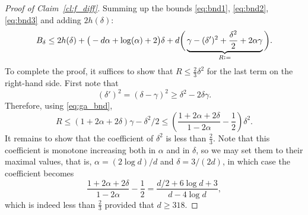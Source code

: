 \documentclass[10pt,a4paper]{amsart}
\newcommand\Coefd{\frac{2}{3}}
\newcommand\al{\alpha}
\newcommand\de{\delta}
\newcommand{\defeq}{\mathrel{\vcenter{\baselineskip0.5ex \lineskiplimit0pt
                     \hbox{\scriptsize.}\hbox{\scriptsize.}}}%
                     =}
\newcommand\ga{\gamma}
\begin{document}
\begin{proof}[Proof of Claim~\ref{cl:f_diff}]
Summing up the bounds \eqref{eq:bnd1}, \eqref{eq:bnd2}, \eqref{eq:bnd3} and adding $2 h(\de)$:
%
\[ B_\de 
\leq 2 h(\de) 
+ \big( -d\al + \log(\al) + 2 \big) \de 
+ d\bigg( 
\underbrace{\ga -(\de')^2 + \frac{\de^2}{2} + 2\al\ga}_
{R \defeq} \bigg) .\]
%
To complete the proof, it suffices to show that $R \leq \Coefd \de^2$ for the last term on the right-hand side. First note that 
%
\[ (\de')^2 = (\de-\ga)^2 \geq \de^2 - 2\de \ga .\]
%
Therefore, using \eqref{eq:ga_bnd}, 
%
\[ R \leq (1+2\al+2\de) \ga - \de^2/2 
\leq \left( \frac{1+2\al+2\de}{1-2\al} 
- \frac{1}{2} \right) \de^2 .\]
%
It remains to show that the coefficient of $\de^2$ is less than $\Coefd$. Note that this coefficient is monotone increasing both in $\al$ and in $\de$, so we may set them to their maximal values, that is, $\al=(2 \log d)/d$ and $\de=3/(2d)$, in which case the coefficient becomes  
%
\[ \frac{1+2\al+2\de}{1-2\al} - \frac{1}{2} 
= \frac{d/2+6 \log d + 3}{d-4 \log d} ,\]
which is indeed less than $\Coefd$ provided that $d \geq 318$.
%
\end{proof}
\end{document}
